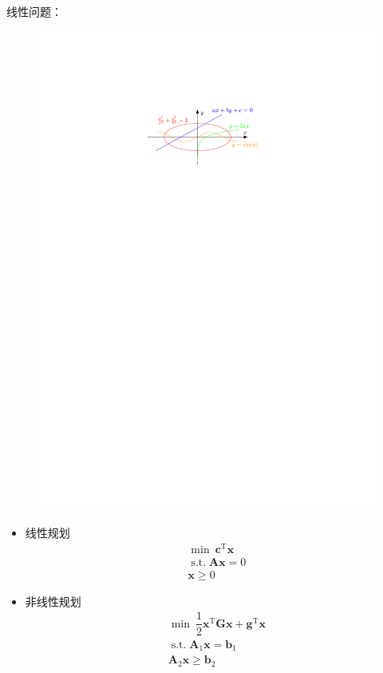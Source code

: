 \begin{note}
    线性问题：
    \begin{figure}[htbp]
        \centering
        \includegraphics{image/线性.pdf}
    \end{figure}
    \begin{itemize}
        \item 线性规划
        \[
            \begin{array}{c}
                \min\ \boldsymbol{c}^{\mathrm{T}}\boldsymbol{x}\\
                \operatorname{s.t.} \boldsymbol{Ax} = 0\\
                \boldsymbol{x}\geqslant 0
            \end{array}
        \]
        \item 非线性规划
        \[
            \begin{array}{c}
                \min\ \dfrac{1}{2}\boldsymbol{x}^{\mathrm{T}}\boldsymbol{Gx}+\boldsymbol{g}^{\mathrm{T}}\boldsymbol{x}\\
                \operatorname{s.t.} \boldsymbol{A}_1\boldsymbol{x} = \boldsymbol{b}_1\\
                \boldsymbol{A}_2\boldsymbol{x} \geqslant \boldsymbol{b}_2
            \end{array}
        \]
    \end{itemize}
\end{note}
